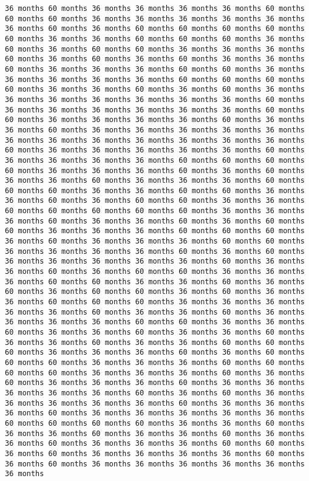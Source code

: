 \documentclass[11pt]{article}
\begin{document}
\begin{Verbatim}[commandchars=\\\{\}, frame=single, framerule=2mm, rulecolor=\color{outerrorbackground}]
36 months 60 months 36 months 36 months 36 months 36 months 60 months 60 months 60 months 36 months 36 months 36 months 36 months 36 months 36 months 60 months 36 months 60 months 60 months 60 months 60 months 60 months 36 months 36 months 60 months 60 months 60 months 36 months 60 months 36 months 60 months 60 months 36 months 36 months 36 months 60 months 36 months 60 months 36 months 60 months 36 months 36 months 60 months 36 months 36 months 36 months 60 months 60 months 36 months 36 months 36 months 36 months 36 months 60 months 60 months 60 months 60 months 36 months 36 months 60 months 36 months 60 months 36 months 36 months 36 months 36 months 36 months 36 months 36 months 60 months 36 months 36 months 36 months 36 months 36 months 36 months 60 months 60 months 36 months 36 months 36 months 36 months 60 months 36 months 36 months 60 months 36 months 36 months 36 months 36 months 36 months 36 months 36 months 36 months 36 months 36 months 36 months 36 months 60 months 36 months 36 months 36 months 36 months 36 months 60 months 36 months 36 months 36 months 36 months 60 months 60 months 60 months 60 months 36 months 36 months 36 months 60 months 36 months 60 months 36 months 36 months 60 months 36 months 36 months 36 months 60 months 60 months 60 months 36 months 36 months 60 months 60 months 36 months 36 months 60 months 36 months 60 months 60 months 36 months 36 months 60 months 60 months 60 months 60 months 60 months 36 months 36 months 36 months 60 months 36 months 36 months 60 months 36 months 60 months 60 months 36 months 36 months 36 months 60 months 60 months 60 months 36 months 60 months 36 months 36 months 36 months 60 months 60 months 36 months 36 months 36 months 36 months 60 months 36 months 60 months 36 months 36 months 36 months 36 months 36 months 60 months 36 months 36 months 60 months 36 months 60 months 60 months 36 months 36 months 36 months 60 months 60 months 36 months 36 months 60 months 36 months 60 months 36 months 60 months 60 months 36 months 60 months 36 months 36 months 60 months 60 months 60 months 36 months 36 months 36 months 36 months 36 months 60 months 36 months 36 months 60 months 36 months 36 months 36 months 36 months 60 months 60 months 36 months 36 months 60 months 36 months 36 months 60 months 36 months 36 months 60 months 36 months 36 months 60 months 36 months 36 months 60 months 60 months 60 months 36 months 36 months 36 months 60 months 36 months 60 months 60 months 60 months 36 months 36 months 36 months 60 months 60 months 60 months 60 months 36 months 36 months 36 months 60 months 36 months 60 months 36 months 36 months 36 months 60 months 36 months 36 months 36 months 36 months 36 months 60 months 36 months 60 months 36 months 36 months 36 months 36 months 36 months 60 months 36 months 36 months 36 months 60 months 36 months 36 months 36 months 36 months 36 months 60 months 60 months 60 months 60 months 36 months 36 months 60 months 36 months 36 months 60 months 36 months 36 months 60 months 36 months 36 months 60 months 36 months 36 months 36 months 60 months 60 months 36 months 60 months 36 months 36 months 36 months 36 months 60 months 36 months 60 months 36 months 36 months 36 months 36 months 36 months 36 months 
\end{Verbatim}
\end{document}
